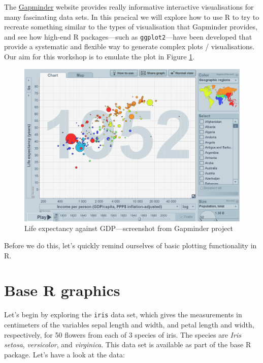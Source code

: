 \documentclass[]{book}
\theoremstyle{definition}
\theoremstyle{definition}
\theoremstyle{definition}
\theoremstyle{remark}
\begin{document}
The \href{https://www.gapminder.org/}{Gapminder} website provides really
informative interactive visualisations for many fascinating data sets.
In this pracical we will explore how to use R to try to recreate
something similar to the types of visualisation that Gapminder provides,
and see how high-end R packages---such as \texttt{ggplot2}---have been
developed that provide a systematic and flexible way to generate complex
plots / visualisations. Our aim for this workshop is to emulate the plot
in Figure \ref{fig:gapminder}.

\begin{figure}

{\centering \includegraphics{images/gapminder} 

}

\caption{Life expectancy against GDP---screenshot from Gapminder project}\label{fig:gapminder}
\end{figure}

Before we do this, let's quickly remind ourselves of basic plotting
functionality in R.

\section{Base R graphics}\label{base-r-graphics}

Let's begin by exploring the \texttt{iris} data set, which gives the
measurements in centimeters of the variables sepal length and width, and
petal length and width, respectively, for 50 flowers from each of 3
species of iris. The species are \emph{Iris setosa}, \emph{versicolor},
and \emph{virginica}. This data set is available as part of the base R
package. Let's have a look at the data:
\end{document}
